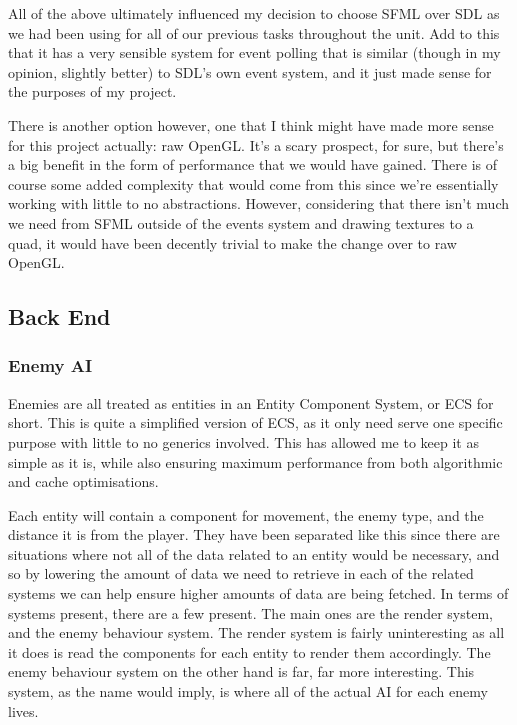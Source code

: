 \documentclass{article}
\begin{document}
All of the above ultimately influenced my decision to choose SFML over SDL as
we had been using for all of our previous tasks throughout the unit. Add to this
that it has a very sensible system for event polling that is similar (though in
my opinion, slightly better) to SDL's own event system, and it just made sense
for the purposes of my project.

There is another option however, one that I think might have made more sense for
this project actually: raw OpenGL. It's a scary prospect, for sure, but there's
a big benefit in the form of performance that we would have gained. There is of
course some added complexity that would come from this since we're essentially
working with little to no abstractions. However, considering that there isn't
much we need from SFML outside of the events system and drawing textures to a
quad, it would have been decently trivial to make the change over to raw OpenGL.

\subsection{Back End}

\subsubsection{Enemy AI}
Enemies are all treated as entities in an Entity Component System, or ECS for
short. This is quite a simplified version of ECS, as it only need serve one
specific purpose with little to no generics involved. This has allowed me to
keep it as simple as it is, while also ensuring maximum performance from both
algorithmic and cache optimisations.

Each entity will contain a component for movement, the enemy type, and the
distance it is from the player. They have been separated like this since there
are situations where not all of the data related to an entity would be
necessary, and so by lowering the amount of data we need to retrieve in each of
the related systems we can help ensure higher amounts of data are being fetched.
In terms of systems present, there are a few present. The main ones are the
render system, and the enemy behaviour system. The render system is fairly
uninteresting as all it does is read the components for each entity to render
them accordingly. The enemy behaviour system on the other hand is far, far more
interesting. This system, as the name would imply, is where all of the actual
AI for each enemy lives.
\end{document}
